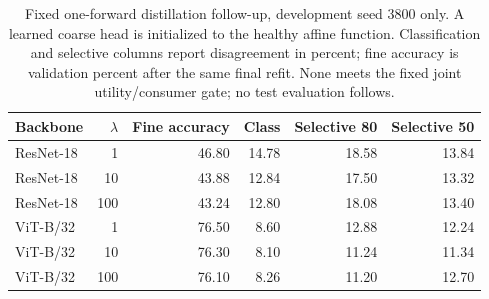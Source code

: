 \begin{table}[t]
\centering
\caption{Fixed one-forward distillation follow-up, development seed 3800 only. A learned coarse head is initialized to the healthy affine function. Classification and selective columns report disagreement in percent; fine accuracy is validation percent after the same final refit. None meets the fixed joint utility/consumer gate; no test evaluation follows.}
\label{tab:vision_protected_head}
\begin{tabular}{lrrrrr}
\toprule
Backbone & $\lambda$ & Fine accuracy & Class & Selective 80 & Selective 50 \\
\midrule
ResNet-18 & 1 & 46.80 & 14.78 & 18.58 & 13.84 \\
ResNet-18 & 10 & 43.88 & 12.84 & 17.50 & 13.32 \\
ResNet-18 & 100 & 43.24 & 12.80 & 18.08 & 13.40 \\
ViT-B/32 & 1 & 76.50 & 8.60 & 12.88 & 12.24 \\
ViT-B/32 & 10 & 76.30 & 8.10 & 11.24 & 11.34 \\
ViT-B/32 & 100 & 76.10 & 8.26 & 11.20 & 12.70 \\
\bottomrule
\end{tabular}
\end{table}
